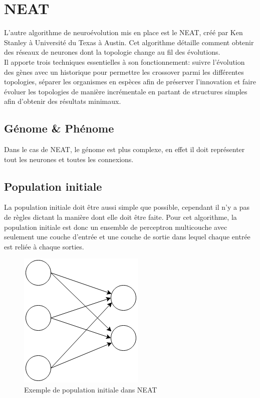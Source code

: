 \documentclass{article}
\begin{document}
\section{NEAT}

L'autre algorithme de neuroévolution mis en place est le NEAT, créé par Ken Stanley à Université du Texas à Austin. Cet algorithme détaille comment obtenir des réseaux de neurones dont la topologie change au fil des évolutions.\\
Il apporte trois techniques essentielles à son fonctionnement: suivre l'évolution des gènes avec un historique pour permettre les crossover parmi les différentes topologies, séparer les organismes en espèces afin de préserver l'innovation et faire évoluer les topologies de manière incrémentale en partant de structures simples afin d'obtenir des résultats minimaux.\cite{wikineat}

\subsection{Génome \& Phénome}

Dans le cas de NEAT, le génome est plus complexe, en effet il doit représenter tout les neurones et toutes les connexions. 

\subsection{Population initiale}

La population initiale doit être aussi simple que possible, cependant il n'y a pas de règles dictant la manière dont elle doit être faite. Pour cet algorithme, la population initiale est donc un ensemble de perceptron multicouche avec seulement une couche d'entrée et une couche de sortie dans lequel chaque entrée est reliée à chaque sorties.

\begin{figure}[h]
\begin{center}
	\includegraphics[scale=0.6]{initneat.png}
	\caption{Exemple de population initiale dans NEAT}
\end{center}
\end{figure}
\end{document}
